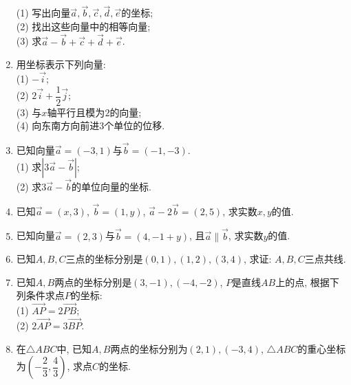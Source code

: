 \documentclass[10pt,a4paper]{article}
\begin{document}
\begin{enumerate}[1.]
\begin{center}
\end{center}
(1) 写出向量$\overrightarrow a,\overrightarrow b,\overrightarrow c,\overrightarrow d,\overrightarrow e$的坐标;\\
(2) 找出这些向量中的相等向量;\\
(3) 求$\overrightarrow a-\overrightarrow b+\overrightarrow c+\overrightarrow d+\overrightarrow e$.
\item 用坐标表示下列向量:\\
(1) $-\overrightarrow i$;\\
(2) $2\overrightarrow i+\dfrac 12\overrightarrow j$;\\
(3) 与$x$轴平行且模为$2$的向量;\\
(4) 向东南方向前进$3$个单位的位移.
\item 已知向量$\overrightarrow a=(-3,1)$与$\overrightarrow b=(-1,-3)$.\\
(1) 求$|3\overrightarrow a-\overrightarrow b|$;\\
(2) 求$3\overrightarrow a-\overrightarrow b$的单位向量的坐标.
\item 已知$\overrightarrow a=(x,3)$, $\overrightarrow b=(1,y)$, $\overrightarrow a-2\overrightarrow b=(2,5)$, 求实数$x,y$的值.
\item 已知向量$\overrightarrow a=(2,3)$与$\overrightarrow b=(4,-1+y)$, 且$\overrightarrow a\parallel \overrightarrow b$, 求实数$y$的值.
\item 已知$A,B,C$三点的坐标分别是$(0,1),(1,2),(3,4)$, 求证: $A,B,C$三点共线.
\item 已知$A,B$两点的坐标分别是$(3,-1),(-4,-2)$, $P$是直线$AB$上的点, 根据下列条件求点$P$的坐标:\\
(1) $\overrightarrow{AP}=2\overrightarrow{PB}$;\\
(2) $2\overrightarrow{AP}=3\overrightarrow{BP}$.
\item 在$\triangle ABC$中, 已知$A,B$两点的坐标分别为$(2,1),(-3,4)$, $\triangle ABC$的重心坐标为$(-\dfrac 23,\dfrac 43)$, 求点$C$的坐标.

\end{enumerate}
\end{document}
